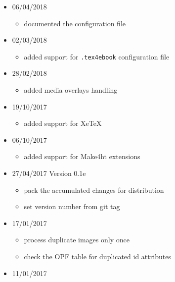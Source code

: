\begin{itemize}
  \begin{itemize}
  \tightlist
  \item
    released version \texttt{0.2}
  \end{itemize}
\item
  06/04/2018

  \begin{itemize}
  \tightlist
  \item
    documented the configuration file
  \end{itemize}
\item
  02/03/2018

  \begin{itemize}
  \tightlist
  \item
    added support for \texttt{.tex4ebook} configuration file
  \end{itemize}
\item
  28/02/2018

  \begin{itemize}
  \tightlist
  \item
    added media overlays handling
  \end{itemize}
\item
  19/10/2017

  \begin{itemize}
  \tightlist
  \item
    added support for XeTeX
  \end{itemize}
\item
  06/10/2017

  \begin{itemize}
  \tightlist
  \item
    added support for Make4ht extensions
  \end{itemize}
\item
  27/04/2017 Version 0.1e

  \begin{itemize}
  \tightlist
  \item
    pack the accumulated changes for distribution
  \item
    set version number from git tag
  \end{itemize}
\item
  17/01/2017

  \begin{itemize}
  \tightlist
  \item
    process duplicate images only once
  \item
    check the OPF table for duplicated id attributes
  \end{itemize}
\item
  11/01/2017


\end{itemize}
